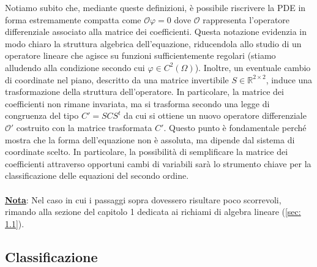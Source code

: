 \documentclass[a4paper,12pt]{report}
\begin{document}
\vspace{0.5cm}

Notiamo subito che, mediante queste definizioni, è possibile riscrivere la PDE in forma estremamente compatta come $\mathcal{O}\varphi =0$ dove $\mathcal{O}$ rappresenta l’operatore differenziale associato alla matrice dei coefficienti. Questa notazione evidenzia in modo chiaro la struttura algebrica dell’equazione, riducendola allo studio di un operatore lineare che agisce su funzioni sufficientemente regolari (stiamo alludendo alla condizione secondo cui $\varphi\in C^2(\Omega)$). Inoltre, un eventuale cambio di coordinate nel piano, descritto da una matrice invertibile $S\in \mathbb{R}^{2\times2}$, induce una trasformazione della struttura dell’operatore. In particolare, la matrice dei coefficienti non rimane invariata, ma si trasforma secondo una legge di congruenza del tipo $C'=SCS^t$ da cui si ottiene un nuovo operatore differenziale $\mathcal{O}'$ costruito con la matrice trasformata $C'$. Questo punto è fondamentale perché mostra che la forma dell’equazione non è assoluta, ma dipende dal sistema di coordinate scelto. In particolare, la possibilità di semplificare la matrice dei coefficienti attraverso opportuni cambi di variabili sarà lo strumento chiave per la classificazione delle equazioni del secondo ordine.
\\
\\ \underline{\textbf{Nota}}: Nel caso in cui i passaggi sopra dovessero risultare poco scorrevoli, rimando alla sezione del capitolo 1 dedicata ai richiami di algebra lineare (\ref{sec: 1.1}).

\newpage



\subsection{Classificazione}\label{sec: 4.1.1}
\end{document}
